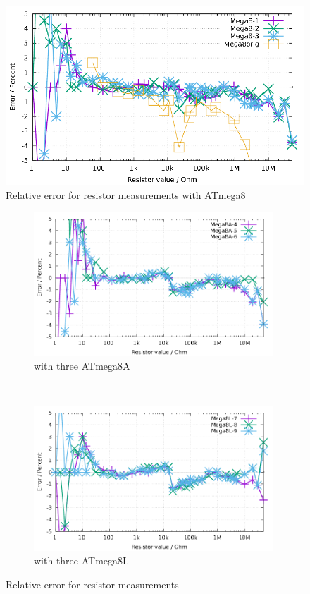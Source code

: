 \begin{figure}[H]
\centering
\includegraphics[width=16cm]{../GNU/Mega8res.pdf}
\caption{Relative error for resistor measurements with ATmega8 }
\label{fig:mega8res}
\end{figure}

\begin{figure}[H]
  \begin{subfigure}[b]{9cm}
    \centering
    \includegraphics[width=9cm]{../GNU/Mega8Ares.pdf}
    \caption{with three ATmega8A}
    \label{fig:mega8Ares}
  \end{subfigure}
  ~
  \begin{subfigure}[b]{9cm}
    \centering
    \includegraphics[width=9cm]{../GNU/Mega8Lres.pdf}
    \caption{with three ATmega8L}
    \label{fig:mega8Lres}
  \end{subfigure}
\caption{Relative error for resistor measurements}
\end{figure}


